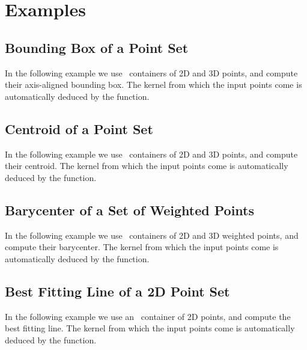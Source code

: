 \label{chap:pca}


\minitoc




\section{Examples}
\label{subsec:pca_examples}

\subsection{Bounding Box of a Point Set}

In the following example we use \stl\ containers of 2D and 3D points, and
compute their axis-aligned bounding box. The kernel from which the input points
come is automatically deduced by the function.


\subsection{Centroid of a Point Set}

In the following example we use \stl\ containers of 2D and 3D points, and
compute their centroid. The kernel from which the input points
come is automatically deduced by the function.


\subsection{Barycenter of a Set of Weighted Points}

In the following example we use \stl\ containers of 2D and 3D weighted points,
and compute their barycenter. The kernel from which the input points come is
automatically deduced by the function.


\subsection{Best Fitting Line of a 2D Point Set}

In the following example we use an \stl\ container of 2D points, and
compute the best fitting line. The kernel from which the input points
come is automatically deduced by the function.


